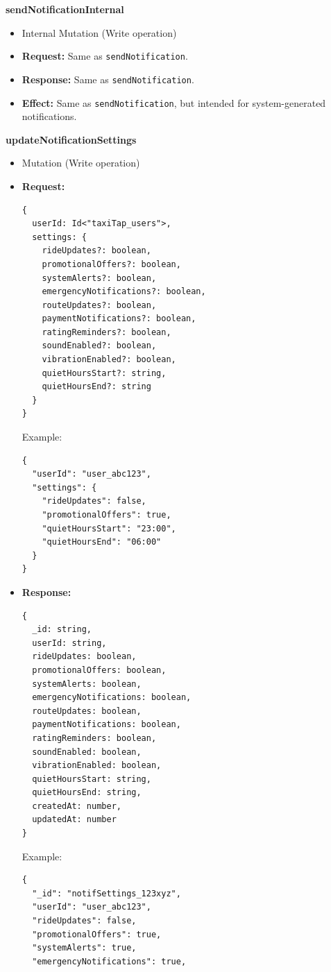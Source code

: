 \documentclass[a4paper,12pt]{article}
\begin{document}
\item \textbf{sendNotificationInternal}
  \begin{itemize}
    \item Internal Mutation (Write operation)
    \item \textbf{Request:}
    Same as \texttt{sendNotification}.
    \item \textbf{Response:}
    Same as \texttt{sendNotification}.
    \item \textbf{Effect:}
    Same as \texttt{sendNotification}, but intended for system-generated notifications.
  \end{itemize}

\item \textbf{updateNotificationSettings}
  \begin{itemize}
    \item Mutation (Write operation)
    \item \textbf{Request:}
    \begin{verbatim}
{
  userId: Id<"taxiTap_users">,
  settings: {
    rideUpdates?: boolean,
    promotionalOffers?: boolean,
    systemAlerts?: boolean,
    emergencyNotifications?: boolean,
    routeUpdates?: boolean,
    paymentNotifications?: boolean,
    ratingReminders?: boolean,
    soundEnabled?: boolean,
    vibrationEnabled?: boolean,
    quietHoursStart?: string,
    quietHoursEnd?: string
  }
}
    \end{verbatim}
    Example:
    \begin{verbatim}
{
  "userId": "user_abc123",
  "settings": {
    "rideUpdates": false,
    "promotionalOffers": true,
    "quietHoursStart": "23:00",
    "quietHoursEnd": "06:00"
  }
}
    \end{verbatim}
    \item \textbf{Response:}
    \begin{verbatim}
{
  _id: string,
  userId: string,
  rideUpdates: boolean,
  promotionalOffers: boolean,
  systemAlerts: boolean,
  emergencyNotifications: boolean,
  routeUpdates: boolean,
  paymentNotifications: boolean,
  ratingReminders: boolean,
  soundEnabled: boolean,
  vibrationEnabled: boolean,
  quietHoursStart: string,
  quietHoursEnd: string,
  createdAt: number,
  updatedAt: number
}
    \end{verbatim}
    Example:
    \begin{verbatim}
{
  "_id": "notifSettings_123xyz",
  "userId": "user_abc123",
  "rideUpdates": false,
  "promotionalOffers": true,
  "systemAlerts": true,
  "emergencyNotifications": true,

\end{verbatim}
\end{itemize}
\end{document}
